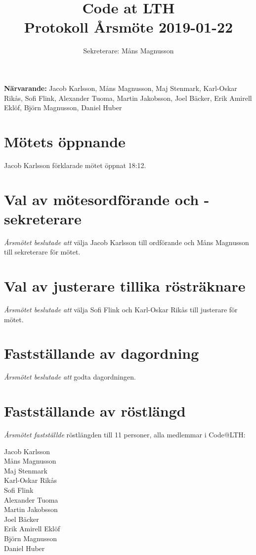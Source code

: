 \documentclass{article}
\begin{document}
\title{
\Huge{Code at LTH}\\
Protokoll Årsmöte 2019-01-22}
\author{ Sekreterare: Måns Magnusson}
\date{}
\maketitle
\thispagestyle{first}

{\bf Närvarande:} Jacob Karlsson, Måns Magnusson, Maj Stenmark, Karl-Oskar Rikås, Sofi Flink, Alexander Tuoma, Martin Jakobsson, Joel Bäcker, Erik Amirell Eklöf, Björn Magnusson, Daniel Huber\\


\section{Mötets öppnande}
Jacob Karlsson förklarade mötet öppnat 18:12.

\section{Val av mötesordförande och -sekreterare}
\emph{Årsmötet beslutade att} välja Jacob Karlsson till ordförande och Måns Magnusson till sekreterare för mötet.

\section{Val av justerare tillika rösträknare} 
\emph{Årsmötet beslutade att} välja Sofi Flink och Karl-Oskar Rikås till justerare för mötet.

\section{Fastställande av dagordning}

\emph{Årsmötet beslutade att} godta dagordningen.

\section{Fastställande av röstlängd}
\emph{Årsmötet fastställde} röstlängden till 11 personer, alla medlemmar i Code@LTH:
\begin{description}
  \item[Jacob Karlsson]
  \item[Måns Magnusson]
  \item[Maj Stenmark]
  \item[Karl-Oskar Rikås]
  \item[Sofi Flink]
  \item[Alexander Tuoma]
  \item[Martin Jakobsson]
  \item[Joel Bäcker]
  \item[Erik Amirell Eklöf]
  \item[Björn Magnusson]
  \item[Daniel Huber]
\end{description}
\end{document}
